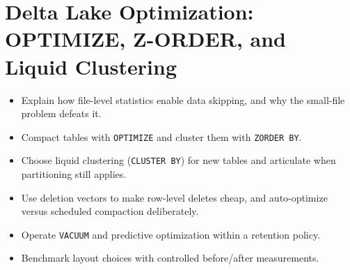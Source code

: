 \chapter{Delta Lake Optimization: OPTIMIZE, Z-ORDER, and Liquid Clustering}
%
%
\begin{objectives}
\begin{itemize}
    \item Explain how file-level statistics enable data skipping, and why the small-file problem defeats it.
    \item Compact tables with \texttt{OPTIMIZE} and cluster them with \texttt{ZORDER BY}.
    \item Choose liquid clustering (\texttt{CLUSTER BY}) for new tables and articulate when partitioning still applies.
    \item Use deletion vectors to make row-level deletes cheap, and auto-optimize versus scheduled compaction deliberately.
    \item Operate \texttt{VACUUM} and predictive optimization within a retention policy.
    \item Benchmark layout choices with controlled before/after measurements.
\end{itemize}
\end{objectives}

